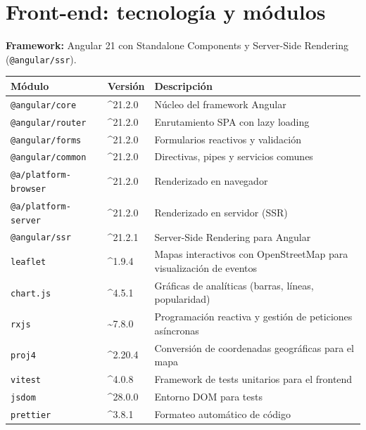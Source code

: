 \documentclass[12pt, a4paper]{article}
\begin{document}
\section{Front-end: tecnología y módulos}

\textbf{Framework:} Angular 21 con Standalone Components y Server-Side Rendering
(\texttt{@angular/ssr}).

\begin{center}
\begin{longtable}{p{4.2cm} p{1.8cm} p{7.5cm}}
  \toprule
  \textbf{Módulo} & \textbf{Versión} & \textbf{Descripción} \\
  \midrule
  \endhead
  \texttt{@angular/core}            & \^{}21.2.0 & Núcleo del framework Angular \\
  \texttt{@angular/router}          & \^{}21.2.0 & Enrutamiento SPA con lazy loading \\
  \texttt{@angular/forms}           & \^{}21.2.0 & Formularios reactivos y validación \\
  \texttt{@angular/common}          & \^{}21.2.0 & Directivas, pipes y servicios comunes \\
  \texttt{@a/platform-browser}& \^{}21.2.0 & Renderizado en navegador \\
  \texttt{@a/platform-server} & \^{}21.2.0 & Renderizado en servidor (SSR) \\
  \texttt{@angular/ssr}             & \^{}21.2.1 & Server-Side Rendering para Angular \\
  \texttt{leaflet}                  & \^{}1.9.4  & Mapas interactivos con OpenStreetMap para visualización de eventos \\
  \texttt{chart.js}                 & \^{}4.5.1  & Gráficas de analíticas (barras, líneas, popularidad) \\
  \texttt{rxjs}                     & \textasciitilde7.8.0 & Programación reactiva y gestión de peticiones asíncronas \\
  \texttt{proj4}                    & \^{}2.20.4 & Conversión de coordenadas geográficas para el mapa \\
  \texttt{vitest}                   & \^{}4.0.8  & Framework de tests unitarios para el frontend \\
  \texttt{jsdom}                    & \^{}28.0.0 & Entorno DOM para tests \\
  \texttt{prettier}                 & \^{}3.8.1  & Formateo automático de código \\
  \bottomrule
\end{longtable}
\end{center}
\end{document}
